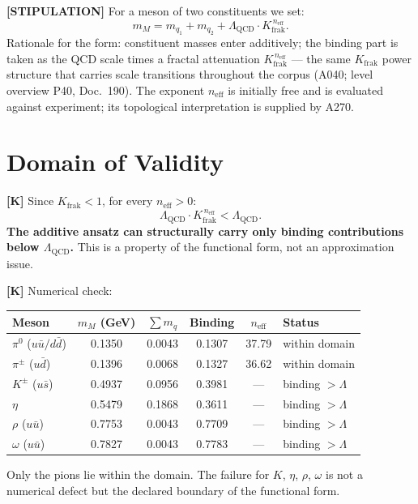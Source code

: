 \textbf{[STIPULATION]} For a meson of two constituents we set:
\[
  m_M = m_{q_1} + m_{q_2}
  + \Lambda_\text{QCD}\cdot K_\text{frak}^{\,n_\text{eff}}.
\]
Rationale for the form: constituent masses enter additively; the
binding part is taken as the QCD scale times a fractal attenuation
$K_\text{frak}^{\,n_\text{eff}}$ --- the same $K_\text{frak}$ power
structure that carries scale transitions throughout the corpus (A040;
level overview P40, Doc.~190). The exponent $n_\text{eff}$ is initially
free and is evaluated against experiment; its topological
interpretation is supplied by A270.

\section{Domain of Validity}

\textbf{[K]} Since $K_\text{frak} < 1$, for every $n_\text{eff} > 0$:
\[
  \Lambda_\text{QCD}\cdot K_\text{frak}^{\,n_\text{eff}} < \Lambda_\text{QCD}.
\]
\textbf{The additive ansatz can structurally carry only binding
contributions below $\Lambda_\text{QCD}$.} This is a property of the
functional form, not an approximation issue.

\medskip
\textbf{[K]} Numerical check:

\begin{center}
\renewcommand{\arraystretch}{1.3}
{\small\begin{tabular}{lcccc l}
\toprule
Meson & $m_M$ (GeV) & $\sum m_q$ & Binding & $n_\text{eff}$ & Status \\
\midrule
$\pi^0$ ($u\bar u/d\bar d$) & 0{.}1350 & 0{.}0043 & 0{.}1307 & 37{.}79 & within domain \\
$\pi^\pm$ ($u\bar d$)       & 0{.}1396 & 0{.}0068 & 0{.}1327 & 36{.}62 & within domain \\
$K^\pm$ ($u\bar s$)         & 0{.}4937 & 0{.}0956 & 0{.}3981 & --- & binding $>\Lambda$ \\
$\eta$                      & 0{.}5479 & 0{.}1868 & 0{.}3611 & --- & binding $>\Lambda$ \\
$\rho$ ($u\bar u$)          & 0{.}7753 & 0{.}0043 & 0{.}7709 & --- & binding $>\Lambda$ \\
$\omega$ ($u\bar u$)        & 0{.}7827 & 0{.}0043 & 0{.}7783 & --- & binding $>\Lambda$ \\
\bottomrule
\end{tabular}}
\renewcommand{\arraystretch}{1.0}
\end{center}

Only the pions lie within the domain. The failure for $K$, $\eta$,
$\rho$, $\omega$ is not a numerical defect but the declared boundary of
the functional form.

